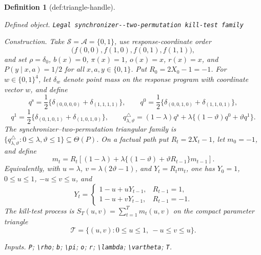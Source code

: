 \documentclass{article}
\newtheorem{definition}{Definition}
\begin{document}
\begin{definition}[def:triangle-handle]\label{def:triangle-handle}
\par\smallskip\noindent\emph{Defined object.} \texttt{Legal synchronizer-\allowbreak{}-\allowbreak{}two-\allowbreak{}permutation kill-\allowbreak{}test family}
\par\smallskip\noindent\emph{Construction.} Take \(\mathcal S=\mathcal A=\{0,1\}\), use response-coordinate order
\[
 \bigl(f(0,0),f(1,0),f(0,1),f(1,1)\bigr),
\]
and set \(\rho=\delta_0\), \(b(x)=0\), \(\pi(x)=1\), \(o(x)=x\), \(r(x)=x\), and \(P(y\mid x,a)=1/2\) for all \(x,a,y\in\{0,1\}\).  Put \(R_0=2X_0-1=-1\).  For \(w\in\{0,1\}^4\), let \(\delta_w\) denote point mass on the response program with coordinate vector \(w\), and define
\[
 q^{\mathrm s}=\frac12\{\delta_{(0,0,0,0)}+\delta_{(1,1,1,1)}\},\qquad
 q^{0}=\frac12\{\delta_{(0,0,1,0)}+\delta_{(1,1,0,1)}\},
\]
\[
 q^{1}=\frac12\{\delta_{(0,1,0,1)}+\delta_{(1,0,1,0)}\},\qquad
 q^{\triangle}_{\lambda,\vartheta}
 =(1-\lambda)q^{\mathrm s}
   +\lambda\{(1-\vartheta)q^0+\vartheta q^1\}.
\]
The synchronizer--two-permutation triangular family is
\(\{q^{\triangle}_{\lambda,\vartheta}:0\leq\lambda,\vartheta\leq1\}\subseteq\Theta(P)\).  On a factual path put \(R_t=2X_t-1\), let \(m_0=-1\), and define
\[
 m_t=R_t\left[(1-\lambda)+\lambda\{(1-\vartheta)+\vartheta R_{t-1}\}m_{t-1}\right].
\]
Equivalently, with \(u=\lambda\), \(v=\lambda(2\vartheta-1)\), and \(Y_t=R_tm_t\), one has \(Y_0=1\), \(0\leq u\leq1\), \(-u\leq v\leq u\), and
\[
 Y_t=
 \begin{cases}
  1-u+uY_{t-1},&R_{t-1}=1,\\
  1-u+vY_{t-1},&R_{t-1}=-1.
 \end{cases}
\]
The kill-test process is \(S_T(u,v)=\sum_{t=1}^T m_t(u,v)\) on the compact parameter triangle
\[
 \mathcal T=\{(u,v):0\leq u\leq1,\ -u\leq v\leq u\}.
\]
\par\smallskip\noindent\emph{Inputs.} \texttt{P}; \texttt{\textbackslash{}\allowbreak{}rho}; \texttt{b}; \texttt{\textbackslash{}\allowbreak{}pi}; \texttt{o}; \texttt{r}; \texttt{\textbackslash{}\allowbreak{}lambda}; \texttt{\textbackslash{}\allowbreak{}vartheta}; \texttt{T}.
\end{definition}
\end{document}
